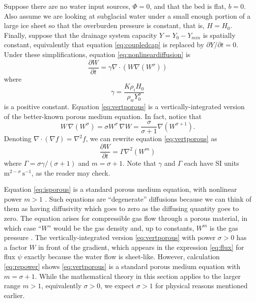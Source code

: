\documentclass[11pt]{amsart}
\begin{document}
Suppose there are no water input sources, $\Phi = 0$, and that the bed is flat, $b = 0$.  Also assume we are looking at subglacial water under a small enough portion of a large ice sheet so that the overburden pressure is constant, that is, $H=H_0$.  Finally, suppose that the drainage system capacity $Y=Y_0-Y_{min}$ is spatially constant, equivalently that equation \eqref{eq:coupledcap} is replaced by $\partial Y/\partial t = 0$.   Under these simplifications, equation \eqref{eq:nonlineardiffusion} is
\begin{equation} \label{eq:vertporous}
\frac{\partial W}{\partial t} = \gamma \nabla \cdot \left( W \nabla \left( W^\sigma \right) \right)
\end{equation}
where
\begin{equation} \label{eq:gammadefn}
   \gamma = \frac{K \rho_i H_0}{\rho_w Y_0^\sigma}
\end{equation}
is a positive constant.  Equation \eqref{eq:vertporous} is a vertically-integrated version of the better-known porous medium equation.  In fact, notice that
\begin{equation} \label{eq:repower}
  W\, \nabla \left( W^\sigma\right) = \sigma W^\sigma\, \nabla W = \frac{\sigma}{\sigma+1} \nabla \left(W^{\sigma+1}\right).
\end{equation}
Denoting $\nabla \cdot \left( \nabla f \right) = \nabla^2 f$, we can rewrite equation \eqref{eq:vertporous} as
\begin{equation} \label{eq:isporous}
\frac{\partial W}{\partial t} = \Gamma \nabla^2 \left( W^m \right)
\end{equation}
where $\Gamma = \sigma \gamma / (\sigma+1)$ and $m=\sigma+1$.  Note that $\gamma$ and $\Gamma$ each have SI units $\text{m}^{2-\sigma}\,\text{s}^{-1}$, as the reader may check. 

Equation \eqref{eq:isporous} is a standard porous medium equation, with nonlinear power $m>1$ \citep{VazquezPME}.  Such equations are ``degenerate'' diffusions because we can think of them as having diffusivity which goes to zero as the diffusing quantity goes to zero.  The equation arises for compressible gas flow through a porous material, in which case ``$W$'' would be the gas density and, up to constants, $W^m$ is the gas pressure \citep{VazquezPME}.  The vertically-integrated version \eqref{eq:vertporous} with power $\sigma>0$ has a factor $W$ in front of the gradient, which appears in the expression \eqref{eq:flux} for flux $\psi$ exactly because the water flow is sheet-like.  However, calculation \eqref{eq:repower} shows \eqref{eq:vertporous} is a standard porous medium equation with $m=\sigma+1$.  While the mathematical theory in this section applies to the larger range $m>1$, equivalently $\sigma>0$, we expect $\sigma>1$ for physical reasons mentioned earlier.
\end{document}
